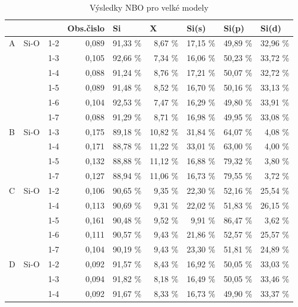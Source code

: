 \documentclass[
  digital, %
  table,   %
  lof,     %
  lot,     %
  oneside,
]{fithesis3}
\begin{document}
\begin{table}
\caption{Výsledky NBO pro velké modely}
\begin{center}
\begin{tabular}{|l|l|l|r|r|r|r|r|r|}
\hline
 &  &  & \multicolumn{1}{l|}{Obs.čislo} & \multicolumn{1}{l|}{Si} & \multicolumn{1}{l|}{X} & \multicolumn{1}{l|}{Si(s)} & \multicolumn{1}{l|}{Si(p)} & \multicolumn{1}{l|}{Si(d)} \\ \hline
A & Si-O & 1-2  & 0,089 & 91,33 \% & 8,67 \% & 17,15 \% & 49,89 \% & 32,96 \% \\ \hline
 &  & 1-3  & 0,105 & 92,66 \% & 7,34 \% & 16,06 \% & 50,23 \% & 33,72 \% \\ \hline
 &  & 1-4  & 0,088 & 91,24 \% & 8,76 \% & 17,21 \% & 50,07 \% & 32,72 \% \\ \hline
 &  & 1-5  & 0,089 & 91,48 \% & 8,52 \% & 16,70 \% & 50,16 \% & 33,13 \% \\ \hline
 &  & 1-6 & 0,104 & 92,53 \% & 7,47 \% & 16,29 \% & 49,80 \% & 33,91 \% \\ \hline
 &  & 1-7 & 0,088 & 91,29 \% & 8,71 \% & 16,98 \% & 49,95 \% & 33,08 \% \\ \hline
B & Si-O & 1-3  & 0,175 & 89,18 \% & 10,82 \% & 31,84 \% & 64,07 \% & 4,08 \% \\ \hline
 &  & 1-4  & 0,171 & 88,78 \% & 11,22 \% & 33,01 \% & 63,00 \% & 4,00 \% \\ \hline
 &  & 1-5  & 0,132 & 88,88 \% & 11,12 \% & 16,88 \% & 79,32 \% & 3,80 \% \\ \hline
 &  & 1-7 & 0,127 & 88,94 \% & 11,06 \% & 16,73 \% & 79,55 \% & 3,72 \% \\ \hline
C & Si-O & 1-2  & 0,106 & 90,65 \% & 9,35 \% & 22,30 \% & 52,16 \% & 25,54 \% \\ \hline
 &  & 1-4  & 0,113 & 90,69 \% & 9,31 \% & 22,02 \% & 51,83 \% & 26,15 \% \\ \hline
 &  & 1-5  & 0,161 & 90,48 \% & 9,52 \% & 9,91 \% & 86,47 \% & 3,62 \% \\ \hline
 &  & 1-6 & 0,111 & 90,57 \% & 9,43 \% & 21,86 \% & 52,57 \% & 25,57 \% \\ \hline
 &  & 1-7 & 0,104 & 90,19 \% & 9,43 \% & 23,30 \% & 51,81 \% & 24,89 \% \\ \hline
D & Si-O & 1-2  & 0,092 & 91,57 \% & 8,43 \% & 16,92 \% & 50,05 \% & 33,03 \% \\ \hline
 &  & 1-3  & 0,094 & 91,82 \% & 8,18 \% & 16,49 \% & 50,05 \% & 33,46 \% \\ \hline
 &  & 1-4  & 0,092 & 91,67 \% & 8,33 \% & 16,73 \% & 49,90 \% & 33,37 \% \\ \hline

\end{tabular}
\end{center}
\end{table}
\end{document}
